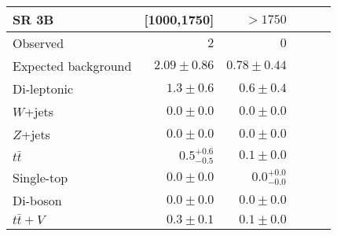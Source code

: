 \begin{tabular*}{\textwidth}{@{\extracolsep{\fill}}lrrrrr}
\toprule
\textbf{SR 3B} & [1000,1750] & $>1750$ \\
\midrule
Observed          & $2$              & $0$                    \\
\midrule
Expected background         & $2.09 \pm 0.86$          & $0.78 \pm 0.44$              \\
\midrule
        Di-leptonic         & $1.3 \pm 0.6$          & $0.6 \pm 0.4$              \\
        $W$+jets         & $0.0 \pm 0.0$          & $0.0 \pm 0.0$              \\
        $Z$+jets         & $0.0 \pm 0.0$          & $0.0 \pm 0.0$              \\
        $t\bar{t}$         & $0.5_{-0.5}^{+0.6}$          & $0.1 \pm 0.0$              \\
        Single-top         & $0.0 \pm 0.0$          & $0.0_{-0.0}^{+0.0}$              \\
        Di-boson         & $0.0 \pm 0.0$          & $0.0 \pm 0.0$              \\
        $t\bar{t}+V$         & $0.3 \pm 0.1$          & $0.1 \pm 0.0$              \\


\bottomrule
\end{tabular*}




